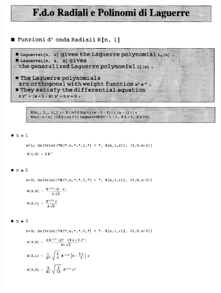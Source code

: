 \documentclass[a4paper,12pt,oneside]{book}
\begin{document}
\begin{figure}[!htbp]
\begin{center}
\includegraphics[width= \textwidth]{immagini/cap_21/fig_21_2.png}\\
\end{center}
\end{figure}
\end{document}

